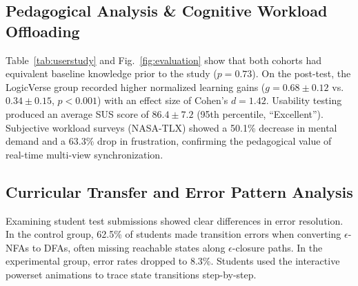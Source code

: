 \documentclass[conference]{IEEEtran}
\begin{document}
\begin{table}[htbp]
\caption{User Study Pedagogical Learning Gains and Usability Metrics ($N = 48$)}
\label{tab:userstudy}
\begin{center}
\end{center}
\end{table}

\subsection{Pedagogical Analysis \& Cognitive Workload Offloading}
Table~\ref{tab:userstudy} and Fig.~\ref{fig:evaluation} show that both cohorts had equivalent baseline knowledge prior to the study ($p = 0.73$). On the post-test, the LogicVerse group recorded higher normalized learning gains ($g = 0.68 \pm 0.12$ vs. $0.34 \pm 0.15$, $p < 0.001$) with an effect size of Cohen's $d = 1.42$. Usability testing produced an average SUS score of $86.4 \pm 7.2$ (95th percentile, ``Excellent''). Subjective workload surveys (NASA-TLX) showed a 50.1\% decrease in mental demand and a 63.3\% drop in frustration, confirming the pedagogical value of real-time multi-view synchronization.

\subsection{Curricular Transfer and Error Pattern Analysis}
Examining student test submissions showed clear differences in error resolution. In the control group, 62.5\% of students made transition errors when converting $\epsilon$-NFAs to DFAs, often missing reachable states along $\epsilon$-closure paths. In the experimental group, error rates dropped to 8.3\%. Students used the interactive powerset animations to trace state transitions step-by-step.
\end{document}
